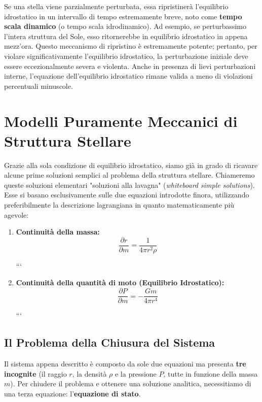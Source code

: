 Se una stella viene parzialmente perturbata, essa ripristinerà l'equilibrio idrostatico in un intervallo di tempo estremamente breve, noto come \textbf{tempo scala dinamico} (o tempo scala idrodinamico). Ad esempio, se perturbassimo l'intera struttura del Sole, esso ritornerebbe in equilibrio idrostatico in appena mezz'ora. Questo meccanismo di ripristino è estremamente potente; pertanto, per violare significativamente l'equilibrio idrostatico, la perturbazione iniziale deve essere eccezionalmente severa e violenta. Anche in presenza di lievi perturbazioni interne, l'equazione dell'equilibrio idrostatico rimane valida a meno di violazioni percentuali minuscole.

\section{Modelli Puramente Meccanici di Struttura Stellare}

Grazie alla sola condizione di equilibrio idrostatico, siamo già in grado di ricavare alcune prime soluzioni semplici al problema della struttura stellare. Chiameremo queste soluzioni elementari "soluzioni alla lavagna" (\textit{whiteboard simple solutions}). Esse si basano esclusivamente sulle due equazioni introdotte finora, utilizzando preferibilmente la descrizione lagrangiana in quanto matematicamente più agevole:

\begin{enumerate}
\item \textbf{Continuità della massa:}
\begin{equation}
\frac{\partial r}{\partial m} = \frac{1}{4\pi r^2 \rho}
\end{equation}

```
\item \textbf{Continuità della quantità di moto (Equilibrio Idrostatico):}
\begin{equation}
    \frac{\partial P}{\partial m} = -\frac{G m}{4\pi r^4}
\end{equation}

```

\end{enumerate}

\subsection{Il Problema della Chiusura del Sistema}

Il sistema appena descritto è composto da sole due equazioni ma presenta \textbf{tre incognite} (il raggio $r$, la densità $\rho$ e la pressione $P$, tutte in funzione della massa $m$).
Per chiudere il problema e ottenere una soluzione analitica, necessitiamo di una terza equazione: l'\textbf{equazione di stato}.

